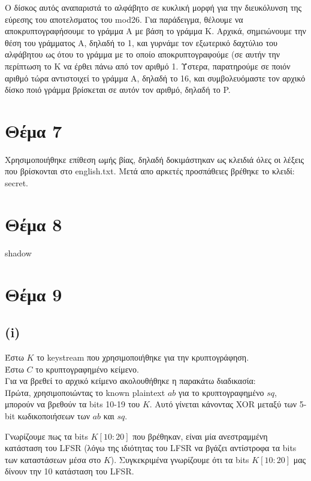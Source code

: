 \documentclass[a4paper, 11pt]{article}
\newcommand{\lt}{\latintext}
\begin{document}
Ο δίσκος αυτός αναπαριστά το αλφάβητο σε κυκλική μορφή για την διευκόλυνση της εύρεσης του αποτελσματος του {\lt mod26}.
Για παράδειγμα, θέλουμε να αποκρυπτογραφήσουμε το γράμμα Α με βάση το γράμμα Κ.
Αρχικά, σημειώνουμε την θέση του γράμματος Α, δηλαδή το 1, και γυρνάμε τον εξωτερικό δαχτύλιο του αλφάβητου ως ότου το γράμμα με το οποίο αποκρυπτογραφούμε (σε αυτήν την περίπτωση το Κ να έρθει πάνω από τον αριθμό 1. Ύστερα, παρατηρούμε σε ποιόν αριθμό τώρα αντιστοιχεί το γράμμα Α, δηλαδή το 16, και συμβολευόμαστε τον αρχικό δίσκο ποιό γράμμα βρίσκεται σε αυτόν τον αριθμό, δηλαδή το {\lt P}.


\newpage


\section*{Θέμα 7}
Χρησιμοποιήθηκε επίθεση ωμής βίας, δηλαδή δοκιμάστηκαν ως κλειδιά όλες οι λέξεις που βρίσκονται στο {\lt english.txt}. Μετά απο αρκετές προσπάθειες
βρέθηκε το κλειδί: {\lt secret}.



\newpage


\section*{Θέμα 8}
shadow



\newpage


\section*{Θέμα 9}
\subsection*{{\lt (i)}}
Έστω $K$ το {\lt keystream} που χρησιμοποιήθηκε για την κρυπτογράφηση.\\
Έστω $C$ το κρυπτογραφημένο κείμενο.\\
Για να βρεθεί το αρχικό κείμενο ακολουθήθηκε η παρακάτω διαδικασία:\\

Πρώτα, χρησιμοποιώντας το {\lt known plaintext} $ab$ για το κρυπτογραφημένο $sq$, μπορούν να βρεθούν τα {\lt bits} 10-19 του $Κ$.
Αυτό γίνεται κάνοντας {\lt XOR} μεταξύ των 5-{\lt bit} κωδικοποιήσεων των $ab$ και $sq$.

Γνωρίζουμε πως τα {\lt bits} $Κ[10:20]$ που βρέθηκαν, είναι μία ανεστραμμένη κατάσταση του {\lt LFSR} (λόγω της ιδιότητας του {\lt LFSR} να βγάζει
αντίστροφα τα {\lt bits} των καταστάσεων μέσα στο $K$). Συγκεκριμένα γνωρίζουμε ότι τα {\lt bits} $Κ[10:20]$ μας δίνουν την 10 κατάσταση του {\lt LFSR}.\\
\end{document}
